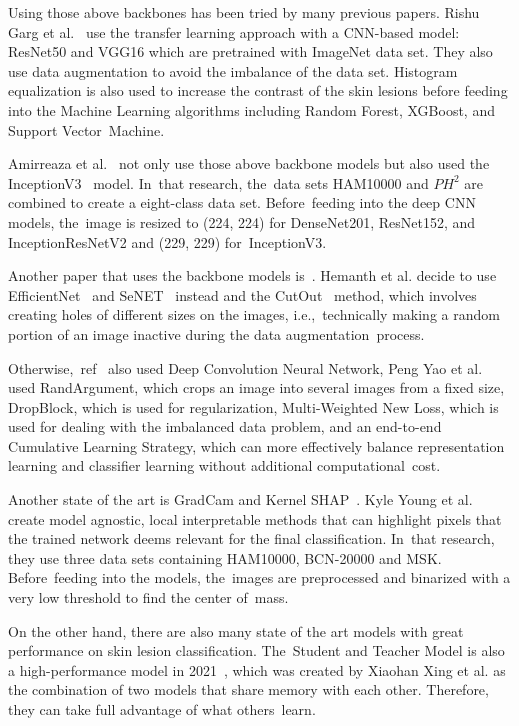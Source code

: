 \documentclass[sensors,article,accept,pdftex,moreauthors]{Definitions/mdpi}
\begin{document}
Using those above backbones has been tried by many previous papers. Rishu Garg et al.~\cite{03798} use the transfer learning approach with a CNN-based model: ResNet50 and VGG16 which are pretrained with ImageNet data set. They also use data augmentation to avoid the imbalance of the data set. Histogram equalization is also used to increase the contrast of the skin lesions before feeding into the Machine Learning algorithms including Random Forest, XGBoost, and Support Vector~Machine.	

Amirreaza et al.~\cite{10348} not only use those above backbone models but also used the  InceptionV3~\cite{00567} model. In~that research, the~data sets HAM10000 and $PH^2$ are combined to create a eight-class data set. Before~feeding into the deep CNN models, the~image is resized to (224, 224) for DenseNet201, ResNet152, and InceptionResNetV2 and (229, 229) for~InceptionV3. 

Another paper that uses the backbone models is~\cite{09418}. Hemanth et al. decide to use EfficientNet~\cite{11946} and SeNET~\cite{01507} instead and the CutOut~\cite{04552v2} method, which involves creating holes of different sizes on the images, i.e.,~technically making a random portion of an image inactive during the data augmentation~process. 

Otherwise,~ref~\cite{01284} also used Deep Convolution Neural Network, Peng Yao et al. used RandArgument, which crops an image into several images from a fixed size, DropBlock, which is used for regularization, Multi-Weighted New Loss, which is used for dealing with the imbalanced data problem, and an end-to-end Cumulative Learning Strategy, which can more effectively balance representation learning and classifier learning without additional computational~cost. 

Another state of the art is GradCam and Kernel SHAP~\cite{06612}. Kyle Young et al. create model agnostic, local interpretable methods that can highlight pixels that the trained network deems relevant for the final classification. In~that research, they use three data sets containing HAM10000, BCN-20000 and MSK. Before~feeding into the models, the~images are preprocessed and binarized with a very low threshold to find the center of~mass. 

On the other hand, there are also many state of the art models with great performance on skin lesion classification. The~Student and Teacher Model is also a high-performance model in 2021~\cite{03225}, which was created by Xiaohan Xing et al. as the combination of two models that share memory with each other. Therefore, they can take full advantage of what others~learn. 
\end{document}
